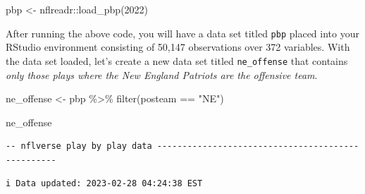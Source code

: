 \documentclass[
  letterpaper,
]{krantz}
\newenvironment{Shaded}{\begin{snugshade}}{\end{snugshade}}
\newcommand{\DecValTok}[1]{\textcolor[rgb]{0.68,0.00,0.00}{#1}}
\newcommand{\FunctionTok}[1]{\textcolor[rgb]{0.28,0.35,0.67}{#1}}
\newcommand{\NormalTok}[1]{\textcolor[rgb]{0.00,0.23,0.31}{#1}}
\newcommand{\OtherTok}[1]{\textcolor[rgb]{0.00,0.23,0.31}{#1}}
\newcommand{\SpecialCharTok}[1]{\textcolor[rgb]{0.37,0.37,0.37}{#1}}
\newcommand{\StringTok}[1]{\textcolor[rgb]{0.13,0.47,0.30}{#1}}
\begin{document}
\begin{Shaded}
\begin{Highlighting}[]
\NormalTok{pbp }\OtherTok{\textless{}{-}}\NormalTok{ nflreadr}\SpecialCharTok{::}\FunctionTok{load\_pbp}\NormalTok{(}\DecValTok{2022}\NormalTok{)}
\end{Highlighting}
\end{Shaded}

After running the above code, you will have a data set titled
\texttt{pbp} placed into your RStudio environment consisting of 50,147
observations over 372 variables. With the data set loaded, let's create
a new data set titled \texttt{ne\_offense} that contains \emph{only
those plays where the New England Patriots are the offensive team}.

\begin{Shaded}
\begin{Highlighting}[]
\NormalTok{ne\_offense }\OtherTok{\textless{}{-}}\NormalTok{ pbp }\SpecialCharTok{\%\textgreater{}\%}
  \FunctionTok{filter}\NormalTok{(posteam }\SpecialCharTok{==} \StringTok{"NE"}\NormalTok{)}

\NormalTok{ne\_offense}
\end{Highlighting}
\end{Shaded}

\begin{verbatim}
-- nflverse play by play data --------------------------------------------------
\end{verbatim}

\begin{verbatim}
i Data updated: 2023-02-28 04:24:38 EST
\end{verbatim}
\end{document}
